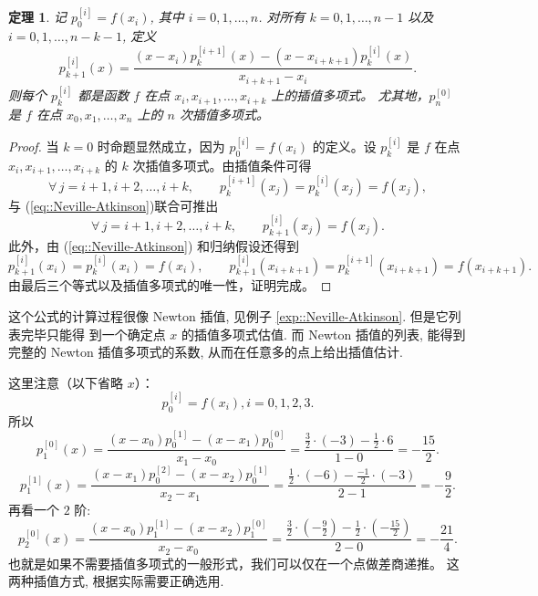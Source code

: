 \documentclass[a4paper]{ctexart}
\newtheorem{theorem}{定理}
\numberwithin{theorem}{section}
\numberwithin{equation}{section}
\numberwithin{figure}{section}
\numberwithin{remark}{section}
\begin{document}
\begin{theorem}
    \label{thm::Neville-Atkinson}
记 $p^{[i]}_{0}=f(x_i)$, 其中 $i=0,1,\ldots,n$. 对所有 $k=0,1,\ldots,n-1$ 以及 $i=0,1,\ldots,n-k-1$, 定义
\begin{equation}
    \label{eq::Neville-Atkinson}
p^{[i]}_{k+1}(x)=\frac{(x-x_i)p^{[i+1]}_{k}(x)-(x-x_{i+k+1})p^{[i]}_{k}(x)}{x_{i+k+1}-x_i}.
\end{equation}
则每个 $p^{[i]}_{k}$ 都是函数 $f$ 在点 $x_i,x_{i+1},\ldots,x_{i+k}$ 上的插值多项式。
尤其地，$p^{[0]}_{n}$ 是 $f$ 在点 $x_0,x_1,\ldots,x_n$ 上的 $n$ 次插值多项式。
\end{theorem}

\begin{proof}
当 $k=0$ 时命题显然成立，因为 $p^{[i]}_{0}=f(x_i)$ 的定义。设 $p^{[i]}_{k}$ 是 $f$ 在点
$x_i,x_{i+1},\ldots,x_{i+k}$ 的 $k$ 次插值多项式。由插值条件可得
\begin{equation*}
\forall\, j=i+1,i+2,\ldots,i+k,\qquad
p^{[i+1]}_{k}(x_j)=p^{[i]}_{k}(x_j)=f(x_j),
\end{equation*}
与 (\ref{eq::Neville-Atkinson})联合可推出
\begin{equation*}
\forall\, j=i+1,i+2,\ldots,i+k,\qquad
p^{[i]}_{k+1}(x_j)=f(x_j).
\end{equation*}
此外，由 (\ref{eq::Neville-Atkinson}) 和归纳假设还得到
\begin{equation*}
p^{[i]}_{k+1}(x_i)=p^{[i]}_{k}(x_i)=f(x_i),\qquad
p^{[i]}_{k+1}(x_{i+k+1})=p^{[i+1]}_{k}(x_{i+k+1})=f(x_{i+k+1}).
\end{equation*}
由最后三个等式以及插值多项式的唯一性，证明完成。
\end{proof}

这个公式的计算过程很像 Newton 插值, 见例子 \ref{exp::Neville-Atkinson}. 但是它列表完毕只能得
到一个确定点 $x$ 的插值多项式估值. 而 Newton 插值的列表, 能得到完整的
Newton 插值多项式的系数, 从而在任意多的点上给出插值估计.

这里注意（以下省略 $x$）：
\[
p_0^{[i]} = f(x_i), i = 0, 1, 2, 3.
\]
所以
\[
p_1^{[0]}(x) = \frac{(x - x_0)p_0^{[1]} - (x - x_1)p_0^{[0]}}{x_1 - x_0}
= \frac{\frac{3}{2} \cdot (-3) - \frac{1}{2} \cdot 6}{1 - 0} = -\frac{15}{2}.
\]
\[
p_1^{[1]}(x) = \frac{(x - x_1)p_0^{[2]} - (x - x_2)p_0^{[1]}}{x_2 - x_1}
= \frac{\frac{1}{2} \cdot (-6) - \frac{-1}{2} \cdot (-3)}{2 - 1} = -\frac{9}{2}.
\]
再看一个 $2$ 阶:
\[
p_2^{[0]}(x) = \frac{(x - x_0)p_1^{[1]} - (x - x_2)p_1^{[0]}}{x_2 - x_0}
= \frac{\frac{3}{2} \cdot (-\frac{9}{2}) - \frac{1}{2} \cdot (-\frac{15}{2})}{2 - 0} 
= -\frac{21}{4}.
\]
也就是如果不需要插值多项式的一般形式，我们可以仅在一个点做差商递推。
这两种插值方式, 根据实际需要正确选用. 
\end{document}
